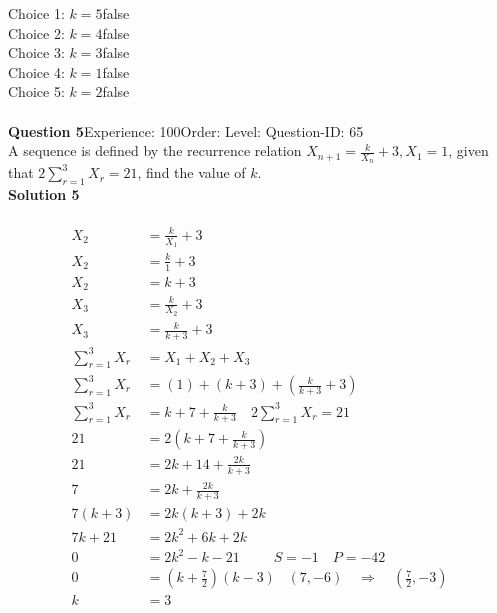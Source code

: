 \documentclass{article}
\begin{document}
Choice 1: \hspace{20pt}$k=5$\hspace{20pt}false\\
Choice 2: \hspace{20pt}$k=4$\hspace{20pt}false\\
Choice 3: \hspace{20pt}$k=3$\hspace{20pt}false\\
Choice 4: \hspace{20pt}$k=1$\hspace{20pt}false\\
Choice 5: \hspace{20pt}$k=2$\hspace{20pt}false\\
\\[4pt]
\noindent\textbf{Question 5}\hspace{20pt}Experience: 100\hspace{20pt}Order: \hspace{20pt}Level: \hspace{20pt}Question-ID: 65\\[2pt]
A sequence is defined by the recurrence relation $X_{n+1}=\displaystyle\frac{k}{X_n}+3, X_1=1$, given that $2\displaystyle\sum_{r=1}^{3} X_r=21$, find the value of $k$.\\[4pt]
\noindent\textbf{Solution 5}\\[2pt]
\\[-35pt]\begin{align*}
X_2&=\displaystyle\frac{k}{X_1}+3\\[2pt]
X_2&=\displaystyle\frac{k}{1}+3\\[2pt]
X_2&=k+3\\[12pt]
X_3&=\displaystyle\frac{k}{X_2}+3\\[2pt]
X_3&=\displaystyle\frac{k}{k+3}+3\\[12pt]
\displaystyle\sum_{r=1}^{3} X_r&=X_1+X_2+X_3\\[2pt]
\displaystyle\sum_{r=1}^{3} X_r&=(1)+(k+3)+\left(\displaystyle\frac{k}{k+3}+3\right)\\[2pt]
\displaystyle\sum_{r=1}^{3} X_r&=k+7+\displaystyle\frac{k}{k+3}\quad 2\displaystyle\sum_{r=1}^{3} X_r=21\\[2pt]
21&=2\left(k+7+\displaystyle\frac{k}{k+3}\right)\\[2pt]
21&=2k+14+\displaystyle\frac{2k}{k+3}\\[2pt]
7&=2k+\displaystyle\frac{2k}{k+3}\\[2pt]
7(k+3)&=2k(k+3)+2k\\[2pt]
7k+21&=2k^2+6k+2k\\[2pt]
0&=2k^2-k-21\hspace{29pt}S=-1\quad P=-42\\[2pt]
0&=\left(k+\displaystyle\frac{7}{2}\right)(k-3)\hspace{10pt}(7,-6)\quad \Rightarrow \quad \left(\displaystyle\frac{7}{2},-3\right)\\[2pt]
k&=3
\end{align*}
\end{document}
